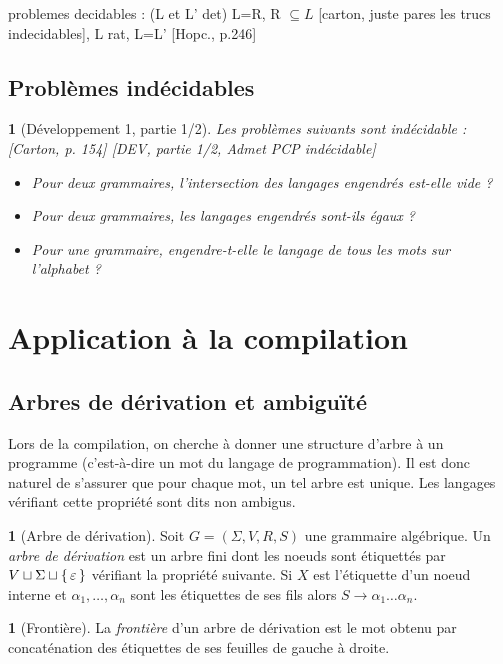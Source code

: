 \documentclass[10pt,a4paper,notitlepage]{article}
\theoremstyle{plain}
\theoremstyle{definition}
\newtheorem{defn}[thm]{\protect\definitionname}
\theoremstyle{definition}
\theoremstyle{remark}
\theoremstyle{remark}
\theoremstyle{plain}
\theoremstyle{plain}
\newtheorem{prop}[thm]{\protect\propositionname}
\theoremstyle{plain}
\theoremstyle{remark}
\providecommand{\definitionname}{Définition}
\providecommand{\propositionname}{Proposition}
\begin{document}
problemes decidables : (L et L' det) L=R, R $\subseteq L$ {[}carton,
juste pares les trucs indecidables{]}, L rat, L=L' {[}Hopc., p.246{]}


\subsection{Problèmes indécidables}
\begin{prop}[Développement 1, partie 1/2]
	Les problèmes suivants sont indécidable : {[}Carton, p. 154{]} {[}DEV, partie 1/2,
	Admet PCP indécidable{]}
	\begin{itemize}
		\item Pour deux grammaires, l'intersection des langages engendrés est-elle
		vide ?
		\item Pour deux grammaires, les langages engendrés sont-ils égaux ?
		\item Pour une grammaire, engendre-t-elle le langage de tous les mots sur
		l'alphabet ?
	\end{itemize}
\end{prop}

\section{Application à la compilation}

\subsection{Arbres de dérivation et ambiguïté} %

Lors de la compilation, on cherche à donner une structure d'arbre à un programme (c'est-à-dire un mot du langage de programmation). Il est donc naturel de s'assurer que pour chaque mot, un tel arbre est unique. Les langages vérifiant cette propriété sont dits non ambigus.

\begin{defn}[Arbre de dérivation]
	Soit $G=(\Sigma,V,R,S)$ une grammaire algébrique. Un \emph{arbre de dérivation} est un arbre fini dont les noeuds sont étiquettés par $V\sqcup \Sigma \sqcup \set{\varepsilon}$ vérifiant la propriété suivante. Si $X$ est l'étiquette d'un noeud interne et $\alpha_1,\dots,\alpha_n$ sont les étiquettes de ses fils alors $S\to \alpha_1\dots\alpha_n$.
\end{defn}

\begin{defn}[Frontière]
	La \emph{frontière} d'un arbre de dérivation est le mot obtenu par concaténation des étiquettes de ses feuilles de gauche à droite.
\end{defn}
\end{document}
